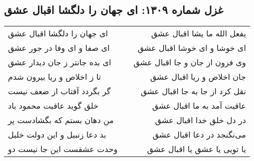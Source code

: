 \begin{center}
\section*{غزل شماره ۱۳۰۹: ای جهان را دلگشا اقبال عشق}
\label{sec:1309}
\begin{longtable}{l p{0.5cm} r}
ای جهان را دلگشا اقبال عشق
&&
یفعل الله ما یشا اقبال عشق
\\
ای صفا و ای وفا در جور عشق
&&
ای خوشا و ای خوشا اقبال عشق
\\
ای بده جانتر ز جان دیدار عشق
&&
وی فزون از جان و جا اقبال عشق
\\
تا ز اخلاص و ریا بیرون شدم
&&
جان اخلاص و ریا اقبال عشق
\\
گر بگردد آفتاب از ضعف نیست
&&
نقل کرد از جا به جا اقبال عشق
\\
خلق گوید عاقبت محمود باد
&&
عاقبت آمد به ما اقبال عشق
\\
من دهان بستم که بگشادست پر
&&
در دل خلق خدا اقبال عشق
\\
بد دعا زنبیل و این دولت خلیل
&&
می‌نگنجد در دعا اقبال عشق
\\
وحدت عشقست این جا نیست دو
&&
یا تویی یا عشق یا اقبال عشق
\\
\end{longtable}
\end{center}
